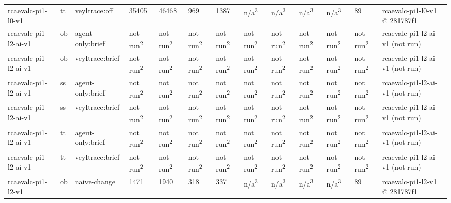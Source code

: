 \begin{table}[t]
\begin{tabular}{lllllllllllll}
rcaevalc-pi1-l0-v1 & tt & veyltrace:off & 35405 & 46468 & 969 & 1387 & n/a\textsuperscript{3} & n/a\textsuperscript{3} & n/a\textsuperscript{3} & n/a\textsuperscript{3} & 89 & rcaevalc-pi1-l0-v1 @ 281787f1 \\
rcaevalc-pi1-l2-ai-v1 & ob & agent-only:brief & not run\textsuperscript{2} & not run\textsuperscript{2} & not run\textsuperscript{2} & not run\textsuperscript{2} & not run\textsuperscript{2} & not run\textsuperscript{2} & not run\textsuperscript{2} & not run\textsuperscript{2} & not run\textsuperscript{2} & rcaevalc-pi1-l2-ai-v1 (not run) \\
rcaevalc-pi1-l2-ai-v1 & ob & veyltrace:brief & not run\textsuperscript{2} & not run\textsuperscript{2} & not run\textsuperscript{2} & not run\textsuperscript{2} & not run\textsuperscript{2} & not run\textsuperscript{2} & not run\textsuperscript{2} & not run\textsuperscript{2} & not run\textsuperscript{2} & rcaevalc-pi1-l2-ai-v1 (not run) \\
rcaevalc-pi1-l2-ai-v1 & ss & agent-only:brief & not run\textsuperscript{2} & not run\textsuperscript{2} & not run\textsuperscript{2} & not run\textsuperscript{2} & not run\textsuperscript{2} & not run\textsuperscript{2} & not run\textsuperscript{2} & not run\textsuperscript{2} & not run\textsuperscript{2} & rcaevalc-pi1-l2-ai-v1 (not run) \\
rcaevalc-pi1-l2-ai-v1 & ss & veyltrace:brief & not run\textsuperscript{2} & not run\textsuperscript{2} & not run\textsuperscript{2} & not run\textsuperscript{2} & not run\textsuperscript{2} & not run\textsuperscript{2} & not run\textsuperscript{2} & not run\textsuperscript{2} & not run\textsuperscript{2} & rcaevalc-pi1-l2-ai-v1 (not run) \\
rcaevalc-pi1-l2-ai-v1 & tt & agent-only:brief & not run\textsuperscript{2} & not run\textsuperscript{2} & not run\textsuperscript{2} & not run\textsuperscript{2} & not run\textsuperscript{2} & not run\textsuperscript{2} & not run\textsuperscript{2} & not run\textsuperscript{2} & not run\textsuperscript{2} & rcaevalc-pi1-l2-ai-v1 (not run) \\
rcaevalc-pi1-l2-ai-v1 & tt & veyltrace:brief & not run\textsuperscript{2} & not run\textsuperscript{2} & not run\textsuperscript{2} & not run\textsuperscript{2} & not run\textsuperscript{2} & not run\textsuperscript{2} & not run\textsuperscript{2} & not run\textsuperscript{2} & not run\textsuperscript{2} & rcaevalc-pi1-l2-ai-v1 (not run) \\
rcaevalc-pi1-l2-v1 & ob & naive-change & 1471 & 1940 & 318 & 337 & n/a\textsuperscript{3} & n/a\textsuperscript{3} & n/a\textsuperscript{3} & n/a\textsuperscript{3} & 89 & rcaevalc-pi1-l2-v1 @ 281787f1 \\

\end{tabular}
\end{table}
